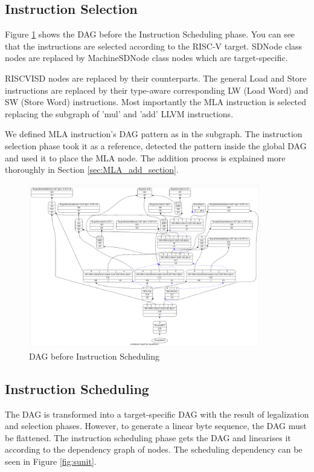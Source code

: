 \subsection{Instruction Selection}
Figure \ref{fig:dag_sched} shows the DAG before the Instruction Scheduling phase. You can see that the instructions are selected according to the RISC-V target. SDNode class nodes are replaced by MachineSDNode class nodes which are target-specific.
\par
RISCVISD nodes are replaced by their counterparts. The general Load and Store instructions are replaced by their type-aware corresponding LW (Load Word) and SW (Store Word) instructions. Most importantly the MLA instruction is selected replacing the subgraph of 'mul' and 'add' LLVM instructions. 
\par
We defined MLA instruction's DAG pattern as in the subgraph. The instruction selection phase took it as a reference, detected the pattern inside the global DAG and used it to place the MLA node. The addition process is explained more thoroughly in Section \ref{sec:MLA_add_section}.

\begin{figure}
    \centering
    \includegraphics[width=0.9\textwidth]{path_instruction/madd_dag_sched.png}
    \caption{DAG before Instruction Scheduling}
    \label{fig:dag_sched}
\end{figure}

\subsection{Instruction Scheduling}
The DAG is transformed into a target-specific DAG with the result of legalization and selection phases. However, to generate a linear byte sequence, the DAG must be flattened. The instruction scheduling phase gets the DAG and linearises it according to the dependency graph of nodes. The scheduling dependency can be seen in Figure \ref{fig:sunit}.

